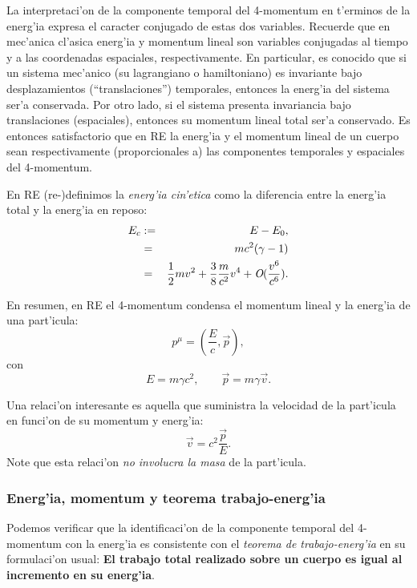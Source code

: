 La interpretaci'on de la componente temporal del 4-momentum en t'erminos de la energ'ia expresa el caracter conjugado de estas dos variables. Recuerde que en mec'anica cl'asica energ'ia y momentum lineal son variables conjugadas al tiempo y a las coordenadas espaciales, respectivamente. En particular, es conocido que si un sistema mec'anico (su lagrangiano o hamiltoniano) es invariante bajo desplazamientos (``translaciones'') temporales, entonces la energ'ia del sistema ser'a conservada. Por otro lado, si el sistema presenta invariancia bajo translaciones (espaciales), entonces su momentum lineal total ser'a conservado. Es entonces satisfactorio que en RE la energ'ia y el momentum lineal de un cuerpo sean respectivamente (proporcionales a) las componentes temporales y espaciales del 4-momentum.

En RE (re-)definimos la \textit{energ'ia cin'etica} como la diferencia entre la
energ'ia total y la energ'ia en reposo:
\begin{eqnarray}
E_{c}&:=&E-E_0,\\
&=&mc^2(\gamma-1)\\
&=&\frac{1}{2}mv^2+\frac{3}{8}\frac{m}{c^2}v^4+\emph{O}(\frac{v^{6}}{c^{6}}).
\end{eqnarray}

En resumen, en RE el 4-momentum condensa el momentum lineal y la energ'ia de una
part'icula:
\begin{equation}
\boxed{p^\mu=(\frac{E}{c},\vec{p}) ,\label{pep}}
\end{equation}
con
\begin{equation}
\boxed{E=m\gamma c^2, \qquad \vec{p}=m\gamma \vec{v}.}
\end{equation}


Una relaci'on interesante es aquella que suministra la velocidad de la
part'icula en funci'on de su momentum y energ'ia:
\begin{equation}
\vec{v}=c^2\frac{\vec{p}}{E}. \label{vpe}
\end{equation}
Note que esta relaci'on \textit{no involucra la masa} de la part'icula.

\subsubsection{Energ'ia, momentum y teorema trabajo-energ'ia}
Podemos verificar que la identificaci'on de la componente temporal del 4-momentum con la energ'ia es consistente con el \textit{teorema de trabajo-energ'ia} en su formulaci'on usual: \textbf{El trabajo total realizado sobre un cuerpo es igual al incremento en su energ'ia}.

